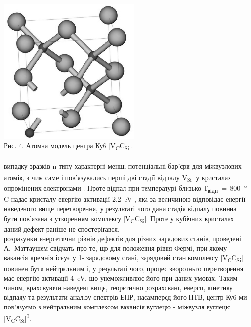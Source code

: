 \\
\includegraphics[width=200pt]{images/g4.eps}\mbox{}\\
\small Рис. 4. Атомна модель центра Ку6 [V\textsubscript{C}C\textsubscript{Si}].\\
\\
\normalsize
{} випадку зразків n-типу характерні менші потенціальні бар'єри для міжвузлових атомів, з чим саме і пов'язувались перші дві стадії відпалу V\textsubscript{Si}\textsuperscript{-} у кристалах опромінених електронами \citep{t1}. Проте відпал при температурі близько Т\textsubscript{відп}~=~800~$\degree$C надає кристалу енергію активації 2.2~eV \citep{t1}, яка за величиною відповідає енергії наведеного вище перетворення, у результаті чого дана стадія відпалу повинна бути пов'язана з утворенням комплексу [V\textsubscript{C}C\textsubscript{Si}]. Проте у кубічних кристалах даний дефект раніше не спостерігався.\\
 розрахунки енергетични рівнів дефектів для різних зарядових станів,  проведені А.~Маттаушем \citep{met1,met2} свідчать про те, що для положення рівня Фермі, при якому вакансія кремнія існує у 1- зарядовому стані, зарядовий стан комплексу [V\textsubscript{C}C\textsubscript{Si}] повинен бути нейтральним і, у результаті чого, процес зворотньго перетворення має енергію активації 4~eV, що унеможливлює його при даних умовах. Таким чином, враховуючи наведені вище, теоретично розраховані, енергії, кінетику відпалу та результати аналізу спектрів ЕПР, насамперед його НТВ, центр Ку6 ми пов'язуємо з нейтральним комплексом вакансія вуглецю - міжвузля вуглецю [V\textsubscript{C}C\textsubscript{Si}]\textsuperscript{0}.\\
